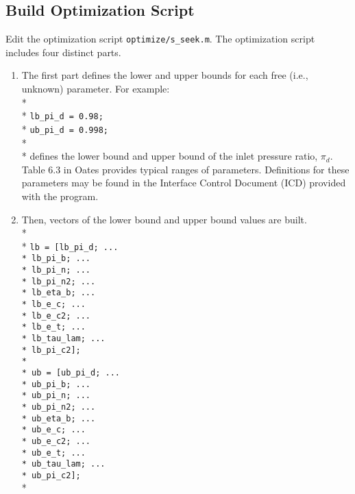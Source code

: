 \documentclass[12pt,twoside]{article}
\begin{document}
\subsection{Build Optimization Script}
Edit the optimization script \texttt{optimize/s\_seek.m}.  The
optimization script includes four distinct parts.
\begin{enumerate}

\item The first part defines the lower and upper bounds for each free
  (i.e., unknown) parameter.  For example: \\*
\\*
\texttt{lb\_pi\_d = 0.98;}\\*
\texttt{ub\_pi\_d = 0.998;}\\*
\\*
defines the lower bound and upper bound of the inlet pressure ratio,
$\pi_d$.  Table 6.3 in Oates \cite{oates} provides typical ranges of
parameters.  Definitions for these parameters may be found in the
Interface Control Document (ICD) provided with the program.

\item Then, vectors of the lower bound and upper bound values are built. \\*
  \\*
  \texttt{lb = [lb\_pi\_d; ...\\*
      lb\_pi\_b; ...\\*
      lb\_pi\_n; ...\\*
      lb\_pi\_n2; ...\\*
      lb\_eta\_b; ...\\*
      lb\_e\_c; ...\\*
      lb\_e\_c2; ...\\*
      lb\_e\_t; ...\\*
      lb\_tau\_lam; ...\\*
      lb\_pi\_c2];\\*
    \\*
  ub = [ub\_pi\_d; ...\\*
      ub\_pi\_b; ...\\*
      ub\_pi\_n; ...\\*
      ub\_pi\_n2; ...\\*
      ub\_eta\_b; ...\\*
      ub\_e\_c; ...\\*
      ub\_e\_c2; ...\\*
      ub\_e\_t; ...\\*
      ub\_tau\_lam; ...\\*
      ub\_pi\_c2];}\\*


\end{enumerate}
\end{document}
